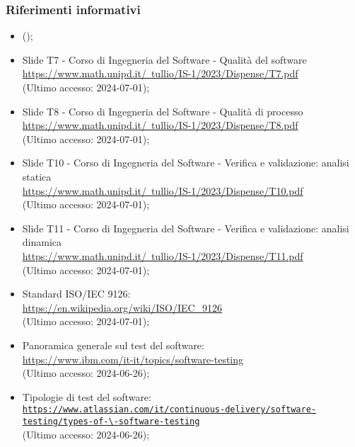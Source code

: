 \subsubsection{Riferimenti informativi}
\begin{itemize}
  \item (\AnalisiDeiRequisiti);
  \item Slide T7 - Corso di Ingegneria del Software - Qualità del software \\ \href{https://www.math.unipd.it/~tullio/IS-1/2023/Dispense/T7.pdf}{https://www.math.unipd.it/~tullio/IS-1/2023/Dispense/T7.pdf}  \\ (Ultimo accesso: 2024-07-01);
  \item Slide T8 - Corso di Ingegneria del Software - Qualità di processo \\ \href{https://www.math.unipd.it/~tullio/IS-1/2023/Dispense/T8.pdf}{https://www.math.unipd.it/~tullio/IS-1/2023/Dispense/T8.pdf}  \\ (Ultimo accesso: 2024-07-01);
  \item Slide T10 - Corso di Ingegneria del Software - Verifica e validazione: analisi statica \\ \href{https://www.math.unipd.it/~tullio/IS-1/2023/Dispense/T10.pdf}{https://www.math.unipd.it/~tullio/IS-1/2023/Dispense/T10.pdf}  \\ (Ultimo accesso: 2024-07-01);
  \item Slide T11 - Corso di Ingegneria del Software - Verifica e validazione: analisi dinamica \\ \href{https://www.math.unipd.it/~tullio/IS-1/2023/Dispense/T11.pdf}{https://www.math.unipd.it/~tullio/IS-1/2023/Dispense/T11.pdf}  \\ (Ultimo accesso: 2024-07-01);
  \item Standard ISO/IEC 9126: \\ \href{https://en.wikipedia.org/wiki/ISO/IEC_9126}{https://en.wikipedia.org/wiki/ISO/IEC\_9126}  \\ (Ultimo accesso: 2024-07-01);
  \item Panoramica generale sul test del software: \\ \href{https://www.ibm.com/it-it/topics/software-testing}{https://www.ibm.com/it-it/topics/software-testing}  \\ (Ultimo accesso: 2024-06-26);
  \item Tipologie di test del software: \\ \href{https://www.atlassian.com/it/continuous-delivery/software-testing/types-of-software-testing}{\nolinkurl{https://www.atlassian.com/it/continuous-delivery/software-testing/types-of-\-software-testing}}  \\ (Ultimo accesso: 2024-06-26);

\end{itemize}

